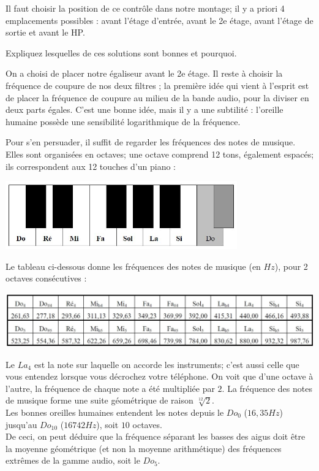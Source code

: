 \documentclass{../template/labo}
\begin{document}
Il faut choisir la position de ce contrôle dans notre montage; il y a priori 4 emplacements possibles : avant l'étage d'entrée, avant le 2e étage, avant l'étage de sortie et avant le HP.

\Question
{
Expliquez lesquelles de ces solutions sont bonnes et pourquoi.
}
{}

On a choisi de placer notre égaliseur avant le 2e étage.
Il reste à choisir la fréquence de coupure de nos deux filtres ; la première idée qui vient à l'esprit est de placer la fréquence de coupure au milieu de la bande audio, pour la diviser en deux parts égales.
C'est une bonne idée, mais il y a une subtilité : l'oreille humaine possède une sensibilité logarithmique de la fréquence.

Pour s'en persuader, il suffit de regarder les fréquences des notes de musique.
Elles sont organisées en octaves; une octave comprend 12 tons, également espacés; ils correspondent aux 12 touches d'un piano :
\begin{center}
\includegraphics[width=10cm]{figures/AOPpiano}
\end{center}

Le tableau ci-dessous donne les fréquences des notes de musique (en $Hz$), pour 2 octaves consécutives :
\begin{center}
\includegraphics[width=16cm]{figures/AOPpianotable}
\end{center}

Le $La_4$ est la note sur laquelle on accorde les instruments; c'est aussi celle que vous entendez lorsque vous décrochez votre téléphone. On voit que d'une octave à l'autre, la fréquence de chaque note a été multipliée par $2$. La fréquence des notes de musique forme une suite géométrique de raison $\sqrt[12]{2}$.\\
Les bonnes oreilles humaines entendent les notes depuis le $Do_0$ ($16,35Hz$) jusqu'au $Do_{10}$ ($16742Hz$), soit $10$ octaves.\\
De ceci, on peut déduire que la fréquence séparant les basses des aigus doit être la moyenne géométrique (et non la moyenne arithmétique) des fréquences extrêmes de la gamme audio, soit le $Do_5$.
\end{document}
